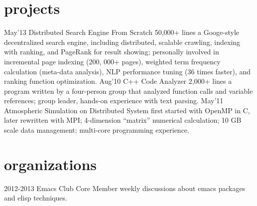 \documentclass[]{friggeri-cv}
\begin{document}
\section{projects}
\begin{entrylist}
  \entry
  {May'13}
  {Distributed Search Engine From Scratch}
  {50,000+ lines}
  {a Googe-style decentralized search engine, including distributed, scalable crawling, indexing with ranking, and PageRank for result showing; personally involved in incremental page indexing (200, 000+ pages), weighted term frequency calculation (meta-data analysis), NLP performance tuning (36 times faster), and ranking function optimization.}
  \entry
  {Aug'10}
  {C++ Code Analyzer}
  {2,000+ lines}
  {a program written by a four-person group that analyzed function calls and variable references; group leader, hands-on experience with text parsing.}
  \entry
  {May'11}
  {Atmospheric Simulation on Distributed System}
  {}
  {first started with OpenMP in C, later rewritten with MPI; 4-dimension “matrix” numerical calculation; 10 GB scale data management; multi-core programming experience.}
\end{entrylist}
\section{organizations}
\begin{entrylist}
  \entry
  {2012-2013}
  {Emacs Club}
  {Core Member}
  {weekly discussions about emacs packages and elisp techniques.}
\end{entrylist}
\end{document}
